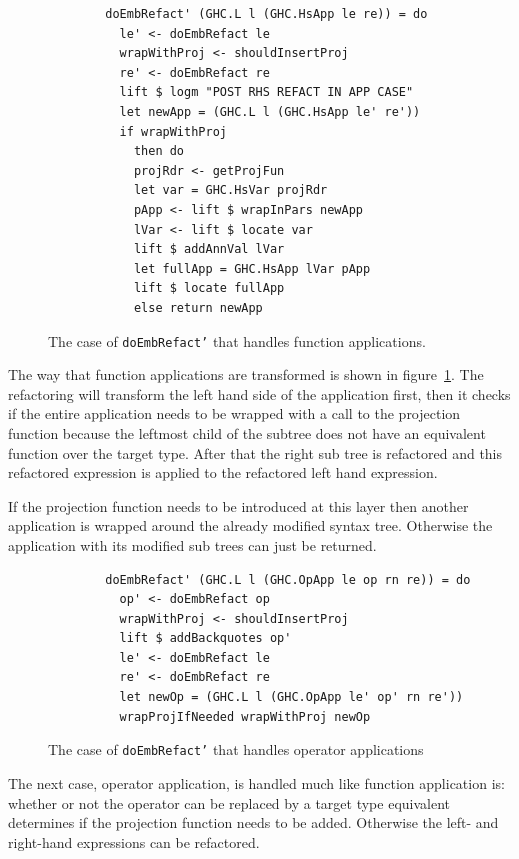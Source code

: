 \begin{figure}[t]
\begin{lstlisting}
        doEmbRefact' (GHC.L l (GHC.HsApp le re)) = do
          le' <- doEmbRefact le
          wrapWithProj <- shouldInsertProj       
          re' <- doEmbRefact re
          lift $ logm "POST RHS REFACT IN APP CASE"
          let newApp = (GHC.L l (GHC.HsApp le' re'))
          if wrapWithProj
            then do
            projRdr <- getProjFun
            let var = GHC.HsVar projRdr
            pApp <- lift $ wrapInPars newApp
            lVar <- lift $ locate var
            lift $ addAnnVal lVar
            let fullApp = GHC.HsApp lVar pApp
            lift $ locate fullApp
            else return newApp
\end{lstlisting}
\caption{The case of \texttt{doEmbRefact'} that handles function applications.}
\label{embRefactApp}
\end{figure}

The way that function applications are transformed is shown in figure~\ref{embRefactApp}. The refactoring will transform the left hand side of the application first, then it checks if the entire application needs to be wrapped with a call to the projection function because the leftmost child of the subtree does not have an equivalent function over the target type. After that the right sub tree is refactored and this refactored expression is applied to the refactored left hand expression.

If the projection function needs to be introduced at this layer then another application is wrapped around the already modified syntax tree. Otherwise the application with its modified sub trees can just be returned.

\begin{figure}[t]
\begin{lstlisting}
        doEmbRefact' (GHC.L l (GHC.OpApp le op rn re)) = do
          op' <- doEmbRefact op
          wrapWithProj <- shouldInsertProj
          lift $ addBackquotes op'
          le' <- doEmbRefact le
          re' <- doEmbRefact re
          let newOp = (GHC.L l (GHC.OpApp le' op' rn re'))
          wrapProjIfNeeded wrapWithProj newOp
\end{lstlisting}
\caption{The case of \texttt{doEmbRefact'} that handles operator applications}
\label{embRefactOp}
\end{figure}

The next case, operator application, is handled much like function application is: whether or not the operator can be replaced by a target type equivalent determines if the projection function needs to be added. Otherwise the left- and right-hand expressions can be refactored. 

